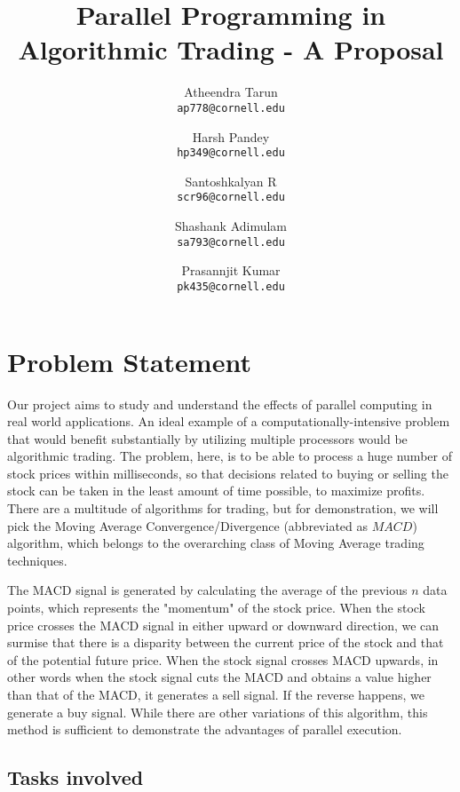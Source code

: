 \documentclass[11pt,english]{article} %
\title{Parallel Programming in Algorithmic Trading - A Proposal}
\author{
  Atheendra Tarun\\
  \texttt{ap778@cornell.edu}
  \and
  Harsh Pandey\\
  \texttt{hp349@cornell.edu}
  \and
  Santoshkalyan R\\
  \texttt{scr96@cornell.edu}
  \and
  Shashank Adimulam\\
  \texttt{sa793@cornell.edu}
  \and
  Prasannjit Kumar\\
  \texttt{pk435@cornell.edu}
}
\begin{document}
\maketitle

\section{Problem Statement}

Our project aims to study and understand the effects of parallel computing in real world applications. An ideal example of a computationally-intensive problem that would benefit substantially by utilizing multiple processors would be algorithmic trading. The problem, here, is to be able to process a huge number of stock prices within milliseconds, so that decisions related to buying or selling the stock can be taken in the least amount of time possible, to maximize profits. There are a multitude of algorithms for trading, but for demonstration, we will pick the Moving Average Convergence/Divergence (abbreviated as $MACD$) algorithm, which belongs to the overarching class of Moving Average trading techniques.

The MACD signal is generated by calculating the average of the previous $n$ data points, which represents the "momentum" of the stock price. When the stock price crosses the MACD signal in either upward or downward direction, we can surmise that there is a disparity between the current price of the stock and that of the potential future price. When the stock signal crosses MACD upwards, in other words when the stock signal cuts the MACD and obtains a value higher than that of the MACD, it generates a sell signal. If the reverse happens, we generate a buy signal. While there are other variations of this algorithm, this method is sufficient to demonstrate the advantages of parallel execution.

\subsection{Tasks involved}
\end{document}
